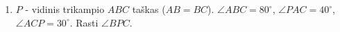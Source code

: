 \begin{enumerate}
\item $P$ - vidinis trikampio $ABC$ taškas ($AB = BC$).
  $\angle ABC = 80^\circ$, $\angle PAC = 40^\circ$, $\angle
  ACP = 30^\circ$. Rasti $\angle BPC$. 
\end{enumerate}

